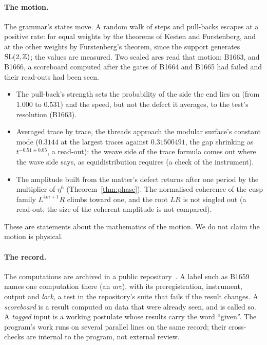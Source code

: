 \paragraph{The motion.}
The grammar's states move. A random walk of steps and pull-backs escapes at a positive rate: for equal weights by the
theorems of Kesten and Furstenberg, and at the other weights by Furstenberg's theorem, since the support generates
$\mathrm{SL}(2,\mathbb{Z})$; the values are measured. Two sealed arcs read that motion: B1663, and B1666, a scoreboard computed after
the gates of B1664 and B1665 had failed and their read-outs had been seen.
\begin{itemize}
\item The pull-back's strength sets the probability of the side the end lies on (from $1.000$ to $0.531$) and the speed, but not
  the defect it averages, to the test's resolution (B1663).
\item Averaged trace by trace, the threads approach the modular surface's constant mode ($0.3144$ at the largest
  traces against $0.31500491$, the gap shrinking as $t^{-0.51\pm0.05}$, a read-out): the weave side of the trace formula comes out where
  the wave side says, as equidistribution requires (a check of the instrument).
\item The amplitude built from the matter's defect returns after one period by the multiplier of $\eta^6$ (Theorem~\ref{thm:phase}). The normalised coherence of the cusp family $L^{4m+1}R$ climbs
  toward one, and the root $LR$ is not singled out (a read-out; the size of the coherent amplitude is not compared).
\end{itemize}
These are statements about the mathematics of the motion. We do not claim the motion is physical.

\paragraph{The record.}
The computations are archived in a public repository~\cite{OriginAxiomRepo}. A label such as B1659 names one
computation there (an \emph{arc}), with its preregistration, instrument, output and \emph{lock}, a test in the
repository's suite that fails if the result changes. A \emph{scoreboard} is a result computed on data that were already
seen, and is called so. A \emph{tagged} input is a working postulate whose results carry the word ``given''. The
program's work runs on several parallel lines on the same record; their cross-checks are internal to the program, not
external review.

